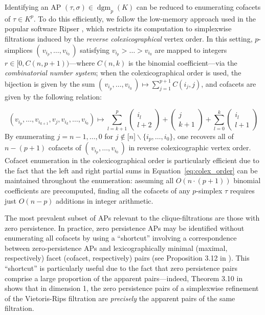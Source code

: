 \documentclass[pdflatex,sn-mathphys-num]{sn-jnl}
\begin{document}
Identifying an AP \((\tau,\sigma) \in \operatorname{dgm}_{p}(K)\) can be reduced to enumerating cofacets of \(\tau \in K^{p}\). To do this efficiently, we follow the low-memory approach used in the popular software Ripser \cite{bauer2021ripser}, which restricts its computation to simplexwise filtrations induced by the \emph{reverse colexicographical} vertex order. In this setting, \(p\)-simplices \(\left( \, v_{i_{p}},\ldots,v_{i_{0}}\, \right)\) satisfying \(v_{i_{p}} > \ldots > v_{i_{0}}\) are mapped to integers \(r \in \lbrack 0,C(n,p + 1))\)---where \(C(n,k)\) is the binomial coefficient---via the \emph{combinatorial number system}; when the colexicographical order is used, the bijection is given by the sum \(\left( \, v_{i_{p}},\ldots,v_{i_{0}}\, \right) \mapsto \sum_{j = 1}^{p + 1}C\left( i_{j},j \right)\), and cofacets are given by the following relation:

\[\label{eq:colex_order}
\left( v_{i_{p}},\ldots,v_{i_{k + 1}},v_{j},v_{i_{k}},\ldots,v_{i_{0}} \right) \mapsto \sum_{l = k + 1}^{p}\begin{pmatrix}
i_{l} \\
l + 2
\end{pmatrix} + \begin{pmatrix}
j \\
k + 1
\end{pmatrix} + \sum_{l = 0}^{k}\begin{pmatrix}
i_{l} \\
l + 1
\end{pmatrix}
\]
\noindent 
By enumerating \(j = n - 1,\ldots,0\) for \(j \notin \left. \lbrack n\rbrack \right.\backslash\{ i_{p},\ldots,i_{0}\}\), one recovers all of \(n - (p + 1)\) cofacets of \(\left( \, v_{i_{p}},\ldots,v_{i_{0}}\, \right)\) in reverse colexicographic vertex order. Cofacet enumeration in the colexicographical order is particularly efficient due to the fact that the left and right partial sums in Equation~\ref{eq:colex_order} can be maintained throughout the enumeration: assuming all \(O\left. \left( n \cdot (p + 1) \right) \right.\) binomial coefficients are precomputed, finding all the cofacets of any \(p\)-simplex \(\tau\) requires just \(O(n - p)\) additions in integer arithmetic.

The most prevalent subset of APs relevant to the clique-filtrations are those with zero persistence. In practice, zero persistence APs may be identified without enumerating all cofacets by using a ``shortcut'' involving a correspondence between zero-persistence APs and lexicographically minimal (maximal, respectively) facet (cofacet, respectively) pairs (see Proposition 3.12 in \cite{bauer2021ripser}). This ``shortcut'' is particularly useful due to the fact that zero persistence pairs comprise a large proportion of the apparent pairs---indeed, Theorem 3.10 in \cite{bauer2021ripser} shows that in dimension 1, the zero persistence pairs of a simplexwise refinement of the Vietoris-Rips filtration are \emph{precisely} the apparent pairs of the same filtration.
\end{document}
